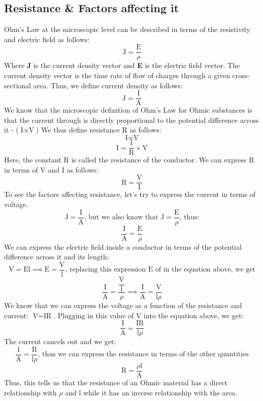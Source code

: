 \documentclass[9pt,addpoints]{exam}
\begin{document}
	\subsection*{Resistance \& Factors affecting it}
	Ohm's Law at the microscopic level can be described in terms of the resistivity and electric field as follows:
	$$\text{J}=\dfrac{\text{E}}{\rho}$$
	Where \textbf{J} is the current density vector and \textbf{E} is the electric field vector. The current density vector is the time rate of flow of charges through a given cross-sectional area. Thus, we define current density as follows:
	$$\text{J}=\dfrac{\text{I}}{\text{A}}$$
	We know that the microscopic definition of Ohm's Law for Ohmic substances is that the current through is directly proportional to the potential difference across it - ($\text{I}\propto\text{V}$) We thus define resistance R as follows:
	$$\text{I}\propto\text{V}$$
	$$\text{I}=\dfrac{1}{\text{R}}\times\text{V}$$
	Here, the constant R is called the resistance of the conductor. We can express R in terms of V and I as follows:
	$$\text{R}=\dfrac{\text{V}}{\text{I}}$$
	To see the factors affecting resistance, let's try to express the current in terms of voltage.
	$$\text{J}=\dfrac{\text{I}}{\text{A}}\text{, but we also know that }\text{J}=\dfrac{\text{E}}{\rho}\text{, thus:}$$
	$$\dfrac{\text{I}}{\text{A}}=\dfrac{\text{E}}{\rho}$$
	We can express the electric field inside a conductor in terms of the potential difference across it and its length:
	$$\text{V}=\text{El}\implies\text{E}=\dfrac{\text{V}}{\text{l}}\text{, replacing this expression E of in the equation above, we get}$$
	$$\dfrac{\text{I}}{\text{A}}=\dfrac{\dfrac{\text{V}}{\text{l}}}{\rho}\implies\dfrac{\text{I}}{\text{A}}=\dfrac{\text{V}}{\text{l}{\rho}}$$
	We know that we can express the voltage as a function of the resistance and current: $\text{V}=\text{IR}$. Plugging in this value of V into the equation above, we get:
	$$\dfrac{\text{I}}{\text{A}}=\dfrac{\text{IR}}{\text{l}{\rho}}$$
	The current cancels out and we get:
	$$\dfrac{1}{\text{A}}=\dfrac{\text{R}}{\text{l}{\rho}}\text{, thus we can express the resistance in terms of the other quantities}$$
	$$\text{R}=\dfrac{\rho\text{l}}{\text{A}}$$
	Thus, this tells us that the resistance of an Ohmic material has a direct relationship with $\rho$ and l while it has an inverse relationship with the area.
\end{document}
